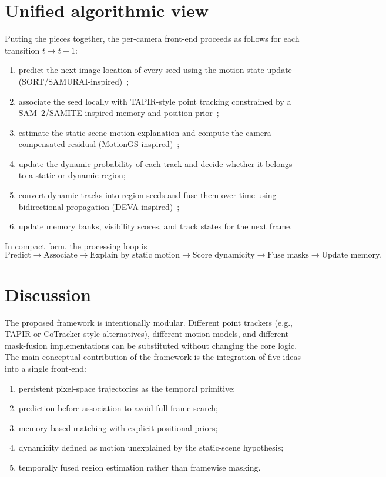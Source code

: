 \documentclass[11pt]{article}
\begin{document}
\section{Unified algorithmic view}
Putting the pieces together, the per-camera front-end proceeds as follows for each transition $t \rightarrow t+1$:
\begin{enumerate}[leftmargin=1.5em]
 \item predict the next image location of every seed using the motion state update (SORT/SAMURAI-inspired)~\cite{sort2016,samurai2024};
 \item associate the seed locally with TAPIR-style point tracking constrained by a SAM~2/SAMITE-inspired memory-and-position prior~\cite{tapir2023,sam2_2024,samite2025};
 \item estimate the static-scene motion explanation and compute the camera-compensated residual (MotionGS-inspired)~\cite{motiongs2024};
 \item update the dynamic probability of each track and decide whether it belongs to a static or dynamic region;
 \item convert dynamic tracks into region seeds and fuse them over time using bidirectional propagation (DEVA-inspired)~\cite{deva2023};
 \item update memory banks, visibility scores, and track states for the next frame.
\end{enumerate}

In compact form, the processing loop is
\begin{equation}
 \text{Predict} \rightarrow \text{Associate} \rightarrow \text{Explain by static motion} \rightarrow \text{Score dynamicity} \rightarrow \text{Fuse masks} \rightarrow \text{Update memory}.
\end{equation}

\section{Discussion}
The proposed framework is intentionally modular. Different point trackers (e.g., TAPIR or CoTracker-style alternatives), different motion models, and different mask-fusion implementations can be substituted without changing the core logic. The main conceptual contribution of the framework is the integration of five ideas into a single front-end:
\begin{enumerate}[leftmargin=1.5em]
 \item persistent pixel-space trajectories as the temporal primitive;
 \item prediction before association to avoid full-frame search;
 \item memory-based matching with explicit positional priors;
 \item dynamicity defined as motion unexplained by the static-scene hypothesis;
 \item temporally fused region estimation rather than framewise masking.
\end{enumerate}
\end{document}
